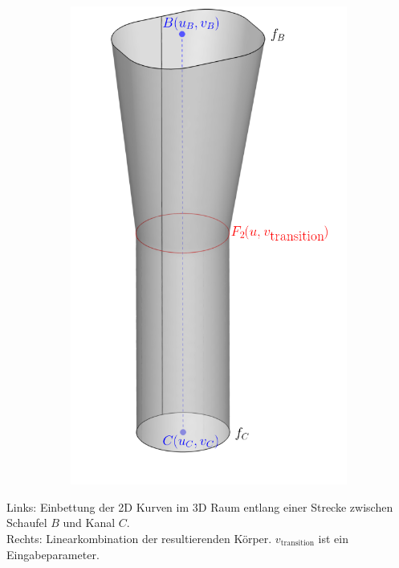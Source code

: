 \documentclass[8pt, aspectratio=169]{beamer}
\begin{document}
\begin{frame}
\begin{minipage}[t]{.5\textwidth}
\begin{figure}[H]
\begin{subfigure}{.49\textwidth}
				\includegraphics[width=\textwidth]{../../tec/holes/01edit.png}
			\end{subfigure}
		\end{figure}
	\end{minipage}
	\begin{minipage}[t]{.49\textwidth}
		\vspace{1cm}
		Links: Einbettung der 2D Kurven im 3D Raum entlang einer Strecke zwischen Schaufel $B$ und Kanal $C$.\\[1em]
		Rechts: Linearkombination der resultierenden Körper. $v_{\textrm{transition}}$ ist ein Eingabeparameter.
	\end{minipage}
	\vfill
\end{frame}
\end{document}
